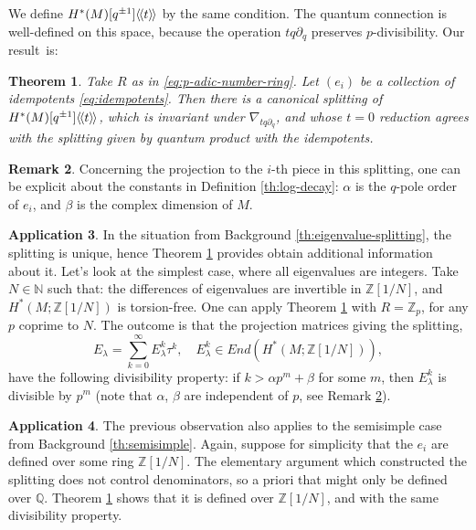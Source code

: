 \documentclass[JEP,XML,SOM,Unicode,NoFloatCountersInSection,published]{cedram}
\theoremstyle{plain}
\newtheorem{theorem}{Theorem}[section]
\theoremstyle{definition}
\newtheorem{remark}[theorem]{Remark}
\newtheorem{application}[theorem]{Application}
\newcommand{\bN}{{\mathbb N}}
\newcommand{\bQ}{{\mathbb Q}}
\newcommand{\bZ}{{\mathbb Z}}
\newcommand{\lla}{\langle\hspace{-0.3ex}\langle}
\newcommand{\rra}{\rangle\hspace{-0.3ex}\rangle}
\begin{document}
We define $H^*(M)[q^{\pm 1}]\lla t\rra$ by the same condition. The quantum connection is well-defined on this space, because the operation $tq\partial_q$ preserves $p$-divisibility. Our result~is:

\begin{theorem} \label{th:p-adic}
Take $R$ as in \eqref{eq:p-adic-number-ring}. Let $(e_i)$ be a collection of idempotents \eqref{eq:idempotents}. Then there is a canonical splitting of $H^*(M)[q^{\pm 1}]\lla t \rra$, which is invariant under $\nabla_{tq\partial_q}$, and whose $t = 0$ reduction agrees with the splitting given by quantum product with the idempotents.
\end{theorem}

\begin{remark} \label{th:constants}
Concerning the projection to the $i$-th piece in this splitting, one can be explicit about the constants in Definition \ref{th:log-decay}: $\alpha$ is the $q$-pole order of $e_i$, and $\beta$ is the complex dimension of $M$.
\end{remark}

\begin{application} \label{th:divisibility-for-eigenvalues}
In the situation from Background \ref{th:eigenvalue-splitting}, the splitting is unique, hence Theorem \ref{th:p-adic} provides obtain additional information about it. Let's look at the simplest case, where all eigenvalues are integers. Take $N \in \bN$ such that: the differences of eigenvalues are invertible in $\bZ[1/N]$, and $H^*(M;\bZ[1/N])$ is torsion-free. One can apply Theorem \ref{th:p-adic} with $R = \bZ_p$, for any $p$ coprime to $N$. The outcome is that the projection matrices giving the splitting,
\begin{equation*}
E_\lambda = \sum_{k=0}^\infty E_{\lambda}^k\tau^k, \quad E_{\lambda}^k \in \mathit{End}(H^*(M;\bZ[1/N])),
\end{equation*}
have the following divisibility property: if $k > \alpha p^m + \beta$ for some $m$, then $E_{\lambda}^k$ is divisible by $p^m$ (note that $\alpha$, $\beta$ are independent of $p$, see Remark \ref{th:constants}).
\end{application}

\begin{application}
The previous observation also applies to the semisimple case from Background \ref{th:semisimple}. Again, suppose for simplicity that the $e_i$ are defined over some ring $\bZ[1/N]$. The elementary argument which constructed the splitting does not control denominators, so a priori that might only be defined over $\bQ$. Theorem \ref{th:p-adic} shows that it is defined over $\bZ[1/N]$, and with the same divisibility property.
\end{application}
\end{document}
